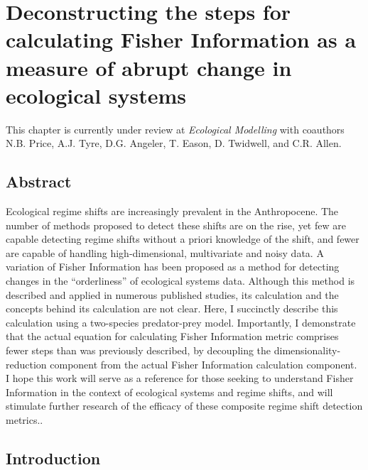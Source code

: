 \documentclass[12pt,twoside,openany]{reedthesis}
\begin{document}
\hypertarget{fiGuide}{%
\chapter{Deconstructing the steps for calculating Fisher Information as a measure of abrupt change in ecological systems}\label{fiGuide}}

This chapter is currently under review at \emph{Ecological Modelling} with coauthors N.B. Price, A.J. Tyre, D.G. Angeler, T. Eason, D. Twidwell, and C.R. Allen.

\hypertarget{abstract}{%
\section{Abstract}\label{abstract}}

Ecological regime shifts are increasingly prevalent in the Anthropocene. The number of methods proposed to detect these shifts are on the rise, yet few are capable detecting regime shifts without a priori knowledge of the shift, and fewer are capable of handling high-dimensional, multivariate and noisy data. A variation of Fisher Information has been proposed as a method for detecting changes in the ``orderliness'' of ecological systems data. Although this method is described and applied in numerous published studies, its calculation and the concepts behind its calculation are not clear. Here, I succinctly describe this calculation using a two-species predator-prey model. Importantly, I demonstrate that the actual equation for calculating Fisher Information metric comprises fewer steps than was previously described, by decoupling the dimensionality-reduction component from the actual Fisher Information calculation component. I hope this work will serve as a reference for those seeking to understand Fisher Information in the context of ecological systems and regime shifts, and will stimulate further research of the efficacy of these composite regime shift detection metrics..

\hypertarget{introduction-1}{%
\section{Introduction}\label{introduction-1}}
\end{document}
